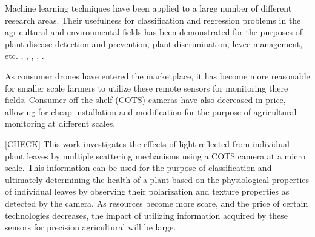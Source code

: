 Machine learning techniques have been applied to a large number of different research areas.  Their usefulness for classification and regression problems in the agricultural and environmental fields has been demonstrated for the purposes of plant disease detection and prevention, plant discrimination, levee management, etc. \cite{mississippi}, \cite{plantdiscrimination}, \cite{plantvirus}, \cite{recognitionplants}, \cite{laserplants}.

As consumer drones have entered the marketplace, it has become more reasonable for smaller scale farmers to utilize these remote sensors for monitoring there fields.  Consumer off the shelf (COTS) cameras have also decreased in price, allowing for cheap installation and modification for the purpose of agricultural monitoring at different scales.

[CHECK] This work investigates the effects of light reflected from individual plant leaves by multiple scattering mechanisms using a COTS camera at a micro scale.  This information can be used for the purpose of classification and ultimately determining the health of a plant based on the physiological properties of individual leaves by observing their polarization and texture properties as detected by the camera.  As resources become more scare, and the price of certain technologies decreases, the impact of utilizing information acquired by these sensors for precision agricultural will be large.
